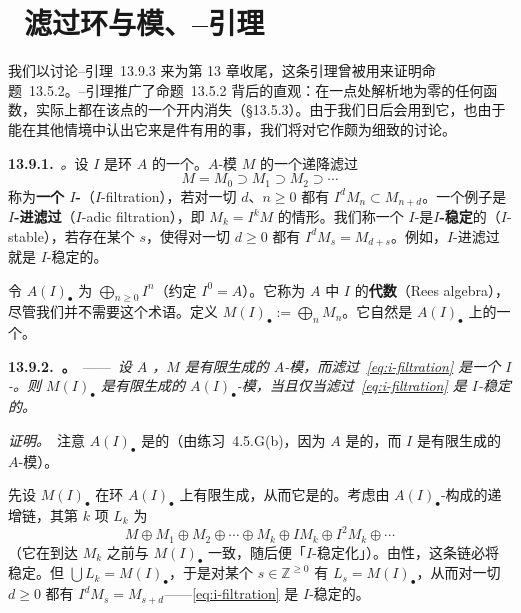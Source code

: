 
\section{\hard\ 滤过环与模、\trArtin--\trRees{}引理}

我们以讨论\trArtin--\trRees{}引理~13.9.3 来为第 13 章收尾，这条引理曾被用来证明命题~13.5.2。\trArtin--\trRees{}引理推广了命题~13.5.2 背后的直观：在一点处解析地为零的任何函数，实际上都在该点的一个开\trNeighborhood{}内消失（\S13.5.3）。由于我们日后会用到它，也由于能在其他情境中认出它来是件有用的事，我们将对它作颇为细致的讨论。

\textbf{13.9.1.}\ \emph{\trhDefinition{}。}\quad 设 $I$ 是环 $A$ 的一个\trIdeal。$A$-模 $M$ 的一个递降滤过
\begin{equation*}\tag{13.9.1.1}\label{eq:i-filtration}
M=M_0\supset M_1\supset M_2\supset\cdots
\end{equation*}
称为\textbf{一个 $I$-\trFiltration}（$I$-filtration），若对一切 $d$、$n\ge0$ 都有 $I^dM_n\subset M_{n+d}$。一个例子是\textbf{$I$-进滤过}（$I$-adic filtration），即 $M_k=I^kM$ 的情形。我们称一个 $I$-\trFiltration{}是\textbf{$I$-稳定}的（$I$-stable），若存在某个 $s$，使得对一切 $d\ge0$ 都有 $I^dM_s=M_{d+s}$。例如，$I$-进滤过就是 $I$-稳定的。

令 $A(I)_\bullet$ 为\trGradedRing{} $\bigoplus_{n\ge0}I^n$（约定 $I^0=A$）。它称为 $A$ 中\trIdeal{} $I$ 的\textbf{\trRees{}代数}（Rees algebra），尽管我们并不需要这个术语。定义 $M(I)_\bullet:=\bigoplus_n M_n$。它自然是 $A(I)_\bullet$ 上的一个\emph{\trGradedModule}。

\textbf{13.9.2.\ \trhProposition{}。}\ ——\ \emph{设 $A$ \trNoetherian，$M$ 是有限生成的 $A$-模，而滤过~\eqref{eq:i-filtration} 是一个 $I$-\trFiltration。则 $M(I)_\bullet$ 是有限生成的 $A(I)_\bullet$-模，当且仅当滤过~\eqref{eq:i-filtration} 是 $I$-稳定的。}

\emph{证明。}\ 注意 $A(I)_\bullet$ 是\trNoetherian{}的（由\mbox{练习~4.5.G(b)}，因为 $A$ 是\trNoetherian{}的，而 $I$ 是有限生成的 $A$-模）。

先设 $M(I)_\bullet$ 在\trNoetherian{}环 $A(I)_\bullet$ 上有限生成，从而它是\trNoetherian{}的。考虑由 $A(I)_\bullet$-\trSubmodule{}构成的递增链，其第 $k$ 项 $L_k$ 为
\[
M\oplus M_1\oplus M_2\oplus\cdots\oplus M_k\oplus IM_k\oplus I^2M_k\oplus\cdots
\]
（它在到达 $M_k$ 之前与 $M(I)_\bullet$ 一致，随后便「$I$-稳定化」）。由\trNoetherian{}性，这条链必将稳定。但 $\bigcup L_k=M(I)_\bullet$，于是对某个 $s\in\mathbb{Z}^{\ge0}$ 有 $L_s=M(I)_\bullet$，从而对一切 $d\ge0$ 都有 $I^dM_s=M_{s+d}$——\eqref{eq:i-filtration} 是 $I$-稳定的。

